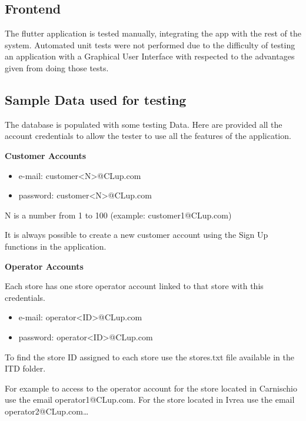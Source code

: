 \subsection{Frontend}

The flutter application is tested manually, integrating the app with the rest of the system. Automated unit tests were not performed due to the difficulty of testing an application with a Graphical User Interface with respected to the advantages given from doing those tests.

\subsection{Sample Data used for testing}
The database is populated with some testing Data. Here are provided all the account credentials to allow the tester to use all the features of the application.

\textbf{Customer Accounts}
\begin{itemize}
    \item e-mail: customer<N>@CLup.com
    \item password: customer<N>@CLup.com
\end{itemize}

N is a number from 1 to 100
(example: customer1@CLup.com)

It is always possible to create a new customer account using the Sign Up functions in the application.

\bigskip

\textbf{Operator Accounts}

Each store has one store operator account linked to that store with this credentials.

\begin{itemize}
    \item e-mail: operator<ID>@CLup.com
    \item password: operator<ID>@CLup.com
\end{itemize}

To find the store ID assigned to each store use the stores.txt file available in the ITD folder.

For example to access to the operator account for the store located in Carnischio use the email operator1@CLup.com. For the store located in Ivrea use the email operator2@CLup.com\ldots
